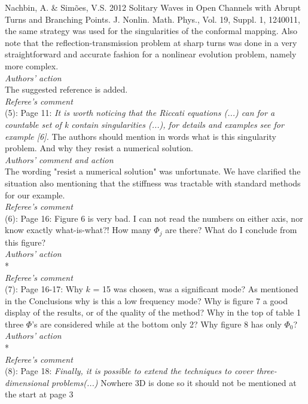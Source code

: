 \documentclass[a4paper,12pt]{article}%
\begin{document}
Nachbin, A. \& Sim\~oes, V.S. 2012 Solitary Waves in Open Channels with Abrupt
Turns and Branching Points. J. Nonlin. Math. Phys., Vol. 19, Suppl. 1, 1240011,\\
the same strategy was used for the singularities of the conformal mapping. Also note that
the reflection-transmission problem at sharp turns was done in a very straightforward
and accurate fashion for a nonlinear evolution problem, namely more complex.\\
{\it Authors' action}\\
The suggested reference is added.\\
\newline
{\it Referee's comment}\\
(5): Page 11: \textit{It is worth noticing that the Riccati equations (...) can for a countable
set of k contain singularities (...), for details and examples see for example [6].} The
authors should mention in words what is this singularity problem. And why they resist
a numerical solution.\\
{\it Authors' comment and action}\\
The wording "resist a numerical solution" was unfortunate. We have clarified the situation also mentioning that the stiffness was tractable with standard methods for our example.\\
\newline
{\it Referee's comment}\\
(6): Page 16: Figure 6 is very bad. I can not read the numbers on either axis, nor
know exactly what-is-what?! How many $\Phi_j$ are there? What do I conclude from this
figure?\\
{\it Authors' action}\\
*\\
\newline
{\it Referee's comment}\\
(7): Page 16-17: Why $k$ = 15 was chosen, was a significant mode? As mentioned
in the Conclusions why is this a low frequency mode? Why is figure 7 a good display
of the results, or of the quality of the method? Why in the top of table 1 three $\Phi$'s are
considered while at the bottom only 2? Why figure 8 has only $\Phi_0$?\\
{\it Authors' action}\\
*\\
\newline
{\it Referee's comment}\\
(8): Page 18: \textit{Finally, it is possible to extend the techniques to cover three-dimensional
problems(...)} Nowhere 3D is done so it should not be mentioned at the start at page 3
\end{document}
